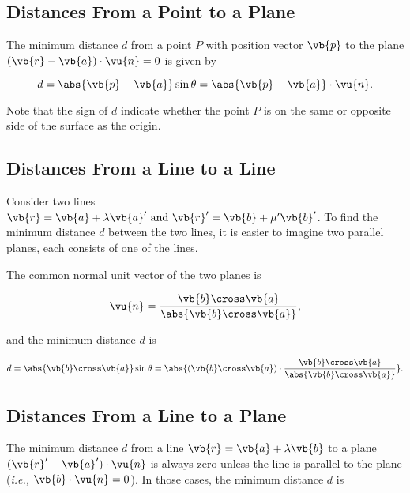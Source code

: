 \documentclass[a4paper,12pt]{report}
\begin{document}
\subsection{Distances From a Point to a Plane}

The minimum distance \(d\) from a point \(P\) with position vector \(\vb{p} \) to the plane \((\vb{r} - \vb{a} )\cdot \vu{n} = 0\)  is given by 

\begin{equation}
    d = \abs{\vb{p} - \vb{a} }\sin \theta = \abs{\vb{p} - \vb{a} }\cdot \vu{n} .  
\end{equation}

Note that the sign of \(d\) indicate whether the point \(P\) is on the same or opposite side of the surface as the origin. 

\subsection{Distances From a Line to a Line}

Consider two lines \(\vb{r} = \vb{a} + \lambda \vb{a}' \text { and } \vb{r} ' = \vb{b} + \mu '\vb{b} '\). To find the minimum distance \(d\) between the two lines, it is easier to imagine two parallel planes, each consists of one of the lines.

The common normal unit vector of the two planes is 

\begin{equation}
    \vu{n} = \frac{\vb{b} \cross \vb{a} }{\abs{\vb{b} \cross \vb{a} } }, 
\end{equation}

and the minimum distance \(d\) is 

\begin{equation}
    d = \abs{\vb{b} \cross \vb{a} } \sin \theta = \abs{(\vb{b} \cross \vb{a} )\cdot \frac{\vb{b} \cross \vb{a} }{\abs{\vb{b} \cross \vb{a} } }} .
\end{equation}

\subsection{Distances From a Line to a Plane}

The minimum distance \(d\) from a line \(\vb{r} = \vb{a} + \lambda \vb{b} \) to a plane \((\vb{r}' - \vb{a} ')\cdot \vu{n} \) is always zero unless the line is parallel to the plane (\textit{i.e.,} \(\vb{b} \cdot \vu{n} = 0\)). In those cases, the minimum distance \(d\) is 
\end{document}
